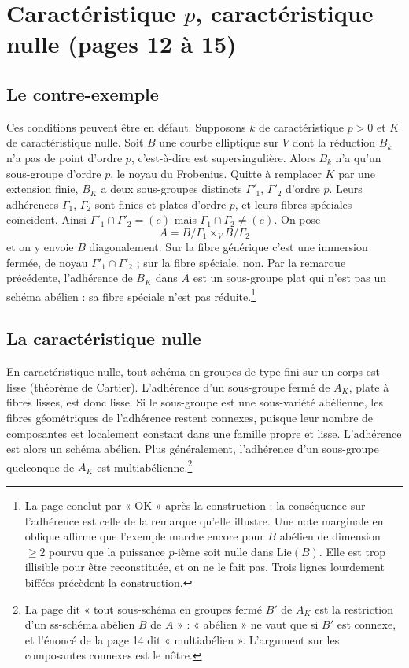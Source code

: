 \documentclass[11pt,a4paper]{article}
\begin{document}
\section*{Caractéristique $p$, caractéristique nulle (pages 12 à 15)}

\subsection*{Le contre-exemple}

Ces conditions peuvent être en défaut. Supposons $k$ de caractéristique $p > 0$
et $K$ de caractéristique nulle. Soit $B$ une courbe elliptique sur $V$ dont la
réduction $B_k$ n'a pas de point d'ordre $p$, c'est-à-dire est
supersingulière. Alors $B_k$ n'a qu'un sous-groupe d'ordre $p$, le noyau du
Frobenius. Quitte à remplacer $K$ par une extension finie, $B_K$ a deux
sous-groupes distincts $\Gamma'_1$, $\Gamma'_2$ d'ordre $p$. Leurs adhérences
$\Gamma_1$, $\Gamma_2$ sont finies et plates d'ordre $p$, et leurs fibres
spéciales coïncident. Ainsi $\Gamma'_1 \cap \Gamma'_2 = (e)$ mais
$\Gamma_1 \cap \Gamma_2 \neq (e)$. On pose
\[
  A = B/\Gamma_1 \times_V B/\Gamma_2
\]
et on y envoie $B$ diagonalement. Sur la fibre générique c'est une immersion
fermée, de noyau $\Gamma'_1 \cap \Gamma'_2$ ; sur la fibre spéciale, non. Par
la remarque précédente, l'adhérence de $B_K$ dans $A$ est un sous-groupe plat
qui n'est pas un schéma abélien : sa fibre spéciale n'est pas
réduite.\footnote{La page conclut par « OK » après la construction ; la
conséquence sur l'adhérence est celle de la remarque qu'elle illustre. Une
note marginale en oblique affirme que l'exemple marche encore pour $B$ abélien
de dimension $\geq 2$ pourvu que la puissance $p$-ième soit nulle dans
$\mathrm{Lie}(B)$. Elle est trop illisible pour être reconstituée, et on ne le
fait pas. Trois lignes lourdement biffées précèdent la construction.}

\subsection*{La caractéristique nulle}

En caractéristique nulle, tout schéma en groupes de type fini sur un corps est
lisse (théorème de Cartier). L'adhérence d'un sous-groupe fermé de $A_K$, plate
à fibres lisses, est donc lisse. Si le sous-groupe est une sous-variété
abélienne, les fibres géométriques de l'adhérence restent connexes, puisque
leur nombre de composantes est localement constant dans une famille propre et
lisse. L'adhérence est alors un schéma abélien. Plus généralement, l'adhérence
d'un sous-groupe quelconque de $A_K$ est multiabélienne.\footnote{La page dit
« tout sous-schéma en groupes fermé $B'$ de $A_K$ est la restriction d'un
ss-schéma abélien $B$ de $A$ » : « abélien » ne vaut que si $B'$ est connexe,
et l'énoncé de la page 14 dit « multiabélien ». L'argument sur les
composantes connexes est le nôtre.}
\end{document}
